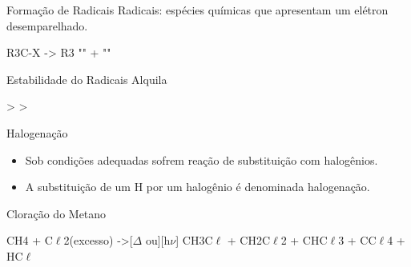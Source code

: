 \documentclass[presentation,professionalfonts,aspectratio=169]{beamer}
\begin{document}
\begin{frame}[label={sec:org3d4e81e}]{Formação de Radicais}
\alert{Radicais:} espécies químicas que apresentam um elétron desemparelhado.

\begin{reaction}
	R3C-X -> R3 ""  +  ""
\end{reaction}


\begin{bclogo}[couleur=blue!30 , arrondi=0.1 , logo=\bcplume , epBarre=3.5]{Estabilidade do Radicais Alquila}
\begin{center}	
 \qquad > \qquad {} \qquad > \qquad {}
\end{center}
\end{bclogo}
\end{frame}

\begin{frame}[label={sec:org0eb0b66}]{Halogenação}
\begin{itemize}
\item Sob condições adequadas sofrem reação de substituição com halogênios.
\item A substituição de um \alert{H} por um halogênio é denominada \alert{halogenação}.
\end{itemize}



\begin{bclogo}[couleur=blue!30 , arrondi=0.1 , logo=\bcplume , epBarre=3.5]{Cloração do Metano}
\begin{reaction*}
CH4 + C$\ell$2(excesso) ->[$\Delta$ ou][h$\nu$] CH3C$\ell$ + CH2C$\ell$2 + CHC$\ell$3 + CC$\ell$4 + HC$\ell$
\end{reaction*}	 
\end{bclogo}
\end{frame}
\end{document}
